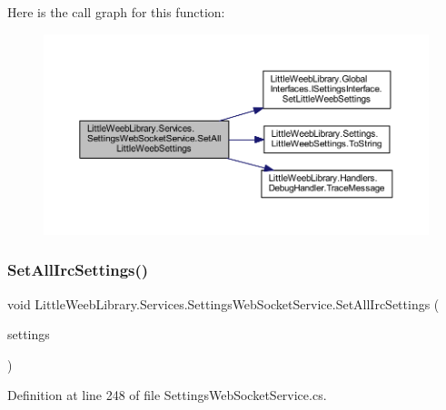 Here is the call graph for this function\+:\nopagebreak
\begin{figure}[H]
\begin{center}
\leavevmode
\includegraphics[width=350pt]{class_little_weeb_library_1_1_services_1_1_settings_web_socket_service_a5ae643bad024f7eca3178d5359886f6f_cgraph}
\end{center}
\end{figure}
\mbox{\label{class_little_weeb_library_1_1_services_1_1_settings_web_socket_service_a6eba1d3b176e627d3dae57070e1c3beb}} 
\subsubsection{\texorpdfstring{Set\+All\+Irc\+Settings()}{SetAllIrcSettings()}}
{\footnotesize\ttfamily void Little\+Weeb\+Library.\+Services.\+Settings\+Web\+Socket\+Service.\+Set\+All\+Irc\+Settings (\begin{DoxyParamCaption}\item[{\mbox{\hyperlink{class_little_weeb_library_1_1_settings_1_1_irc_settings}{Irc\+Settings}}}]{settings }\end{DoxyParamCaption})\hspace{0.3cm}{\ttfamily [private]}}



Definition at line 248 of file Settings\+Web\+Socket\+Service.\+cs.



